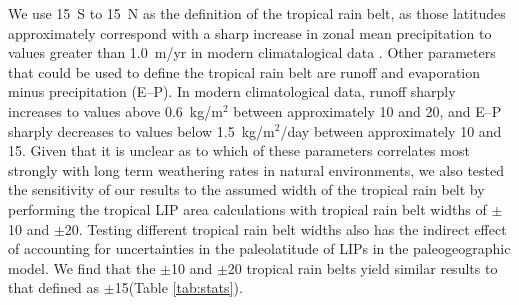 \documentclass[11pt,letterpaper]{article}
\begin{document}
We use 15\textdegree~S to 15\textdegree~N as the definition of the tropical rain belt, as those latitudes approximately correspond with a sharp increase in zonal mean precipitation to values greater than 1.0~m/yr in modern climatalogical data \citep{Kalnay1996a}. Other parameters that could be used to define the tropical rain belt are runoff and evaporation minus precipitation (E--P). In modern climatological data, runoff sharply increases to values above 0.6~kg/m$^{2}$ between approximately 10 and 20\textdegree\xspace, and E--P sharply decreases to values below 1.5~kg/m$^{2}$/day between approximately 10 and 15\textdegree. Given that it is unclear as to which of these parameters correlates most strongly with long term weathering rates in natural environments, we also tested the sensitivity of our results to the assumed width of the tropical rain belt by performing the tropical LIP area calculations with tropical rain belt widths of $\pm$10\textdegree\xspace and $\pm$20\textdegree. Testing different tropical rain belt widths also has the indirect effect of accounting for uncertainties in the paleolatitude of LIPs in the paleogeographic model. We find that the $\pm$10\textdegree\xspace and $\pm$20\textdegree\xspace tropical rain belts yield similar results to that defined as $\pm$15\textdegree\xspace (Table \ref{tab:stats}).
\end{document}
